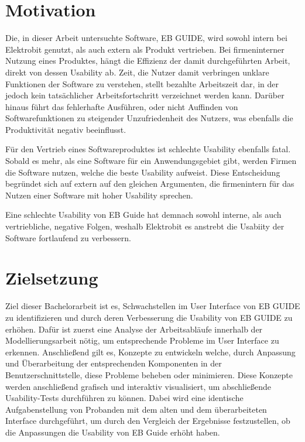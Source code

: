 \section{Motivation}
Die, in dieser Arbeit untersuchte Software, EB GUIDE, wird sowohl intern bei Elektrobit genutzt, als auch extern als Produkt vertrieben.
Bei firmeninterner Nutzung eines Produktes, hängt die Effizienz der damit durchgeführten Arbeit, direkt von dessen Usability ab.
Zeit, die Nutzer damit verbringen unklare Funktionen der Software zu verstehen, stellt bezahlte Arbeitszeit dar, in der jedoch kein tatsächlicher Arbeitsfortschritt verzeichnet werden kann.
Darüber hinaus führt das fehlerhafte Ausführen, oder nicht Auffinden von Softwarefunktionen zu steigender Unzufriedenheit des Nutzers, was ebenfalls die Produktivität negativ beeinflusst.

Für den Vertrieb eines Softwareproduktes ist schlechte Usability ebenfalls fatal.
Sobald es mehr, als eine Software für ein Anwendungsgebiet gibt, werden Firmen die Software nutzen, welche die beste Usability aufweist.
Diese Entscheidung begründet sich auf extern auf den gleichen Argumenten, die firmenintern für das Nutzen einer Software mit hoher Usability sprechen.

Eine schlechte Usability von EB Guide hat demnach sowohl interne, als auch vertriebliche, negative Folgen, weshalb Elektrobit es anstrebt die Usabiity der Software fortlaufend zu verbessern.

\section{Zielsetzung}
Ziel dieser Bachelorarbeit ist es, Schwachstellen im User Interface von EB GUIDE zu identifizieren und durch deren Verbesserung die Usability von EB GUIDE zu erhöhen.
Dafür ist zuerst eine Analyse der Arbeitsabläufe innerhalb der Modellierungsarbeit nötig, um entsprechende Probleme im User Interface zu erkennen.
Anschließend gilt es, Konzepte zu entwickeln welche, durch Anpassung und Überarbeitung der entsprechenden Komponenten in der Benutzerschnittstelle, diese Probleme beheben oder minimieren.
Diese Konzepte werden anschließend grafisch und interaktiv visualisiert, um abschließende Usability-Tests durchführen zu können.
Dabei wird eine identische Aufgabenstellung von Probanden mit dem alten und dem überarbeiteten Interface durchgeführt, um durch den Vergleich der Ergebnisse festzustellen, ob die Anpassungen die Usability von EB Guide erhöht haben.


